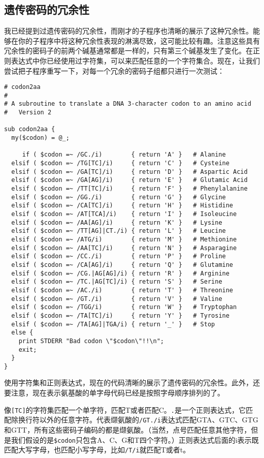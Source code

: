 \subsection{遗传密码的冗余性}
我已经提到过遗传密码的冗余性，而刚才的子程序也清晰的展示了这种冗余性。能够在你的子程序中将这种冗余性表现的淋漓尽致，这可能比较有趣。注意这些具有冗余性的密码子的前两个碱基通常都是一样的，只有第三个碱基发生了变化。在正则表达式中你已经使用过字符集，可以来匹配任意的一个字符集合。现在，让我们尝试把子程序重写一下，对每一个冗余的密码子组都只进行一次测试：

\begin{lstlisting}
# codon2aa
#
# A subroutine to translate a DNA 3-character codon to an amino acid
#   Version 2

sub codon2aa {
  my($codon) = @_;
 
     if ( $codon =~ /GC./i)        { return 'A' }   # Alanine
  elsif ( $codon =~ /TG[TC]/i)     { return 'C' }   # Cysteine
  elsif ( $codon =~ /GA[TC]/i)     { return 'D' }   # Aspartic Acid
  elsif ( $codon =~ /GA[AG]/i)     { return 'E' }   # Glutamic Acid
  elsif ( $codon =~ /TT[TC]/i)     { return 'F' }   # Phenylalanine
  elsif ( $codon =~ /GG./i)        { return 'G' }   # Glycine
  elsif ( $codon =~ /CA[TC]/i)     { return 'H' }   # Histidine
  elsif ( $codon =~ /AT[TCA]/i)    { return 'I' }   # Isoleucine
  elsif ( $codon =~ /AA[AG]/i)     { return 'K' }   # Lysine
  elsif ( $codon =~ /TT[AG]|CT./i) { return 'L' }   # Leucine
  elsif ( $codon =~ /ATG/i)        { return 'M' }   # Methionine
  elsif ( $codon =~ /AA[TC]/i)     { return 'N' }   # Asparagine
  elsif ( $codon =~ /CC./i)        { return 'P' }   # Proline
  elsif ( $codon =~ /CA[AG]/i)     { return 'Q' }   # Glutamine
  elsif ( $codon =~ /CG.|AG[AG]/i) { return 'R' }   # Arginine
  elsif ( $codon =~ /TC.|AG[TC]/i) { return 'S' }   # Serine
  elsif ( $codon =~ /AC./i)        { return 'T' }   # Threonine
  elsif ( $codon =~ /GT./i)        { return 'V' }   # Valine
  elsif ( $codon =~ /TGG/i)        { return 'W' }   # Tryptophan
  elsif ( $codon =~ /TA[TC]/i)     { return 'Y' }   # Tyrosine
  elsif ( $codon =~ /TA[AG]|TGA/i) { return '_' }   # Stop
  else {
    print STDERR "Bad codon \"$codon\"!!\n";
    exit;
  }
}
\end{lstlisting}

使用字符集和正则表达式，现在的代码清晰的展示了遗传密码的冗余性。此外，还要注意，现在表示氨基酸的单字母代码已经是按照字母顺序排列的了。

像\verb|[TC]|的字符集匹配一个单字符，匹配T或者匹配C。\verb|.|是一个正则表达式，它匹配除换行符以外的任意字符。代表缬氨酸的\verb|/GT./i|表达式匹配GTA、GTC、GTG和GTT，所有这些密码子编码的都是缬氨酸。（当然，点号匹配任意其他字符，但是我们假设的是\verb|$codon|只包含A、C、G和T四个字符。）正则表达式后面的i表示既匹配大写字母，也匹配小写字母，比如\verb|/T/i|就匹配T或者t。

